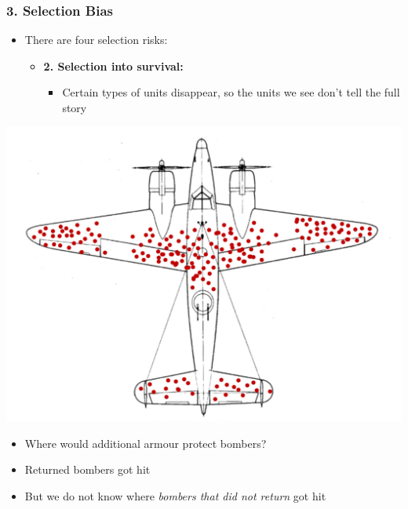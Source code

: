\documentclass[xcolor=x11names,compress]{beamer}\usepackage[]{graphicx}\usepackage[]{color}
\renewcommand{\(}{\begin{columns}}
\renewcommand{\)}{\end{columns}}
\newcommand{\<}[1]{\begin{column}{#1}}
\renewcommand{\>}{\end{column}}
\begin{document}
\begin{frame}
\frametitle{3. Selection Bias}
\begin{itemize}
\item There are four selection risks:
\begin{itemize}
\item \textbf{2. Selection into survival:}
\pause
\begin{itemize}
\item Certain types of units disappear, so the units we see don't tell the full story
\end{itemize}
\pause
\end{itemize}
\end{itemize}
\begin{multicols}{2}
\includegraphics[scale=0.25]{Bombers.pdf}
\columnbreak
\begin{itemize}
\item Where would additional armour protect bombers?
\pause
\item Returned bombers got hit
\pause
\item But we do not know where \textit{bombers that did not return} got hit
\end{itemize}
\end{multicols}
\end{frame}
\end{document}
